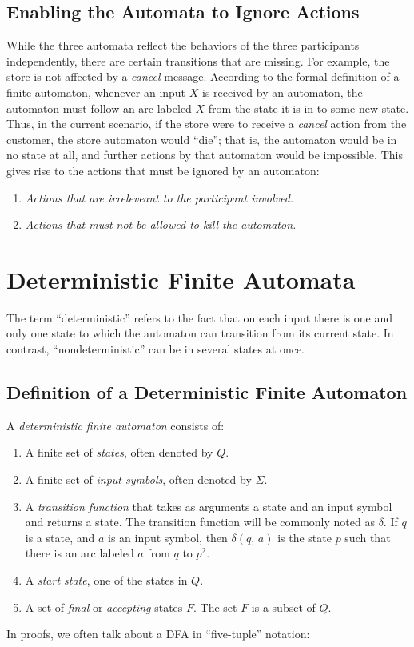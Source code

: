 \documentclass[]{article}
\begin{document}
  \subsection*{Enabling the Automata to Ignore Actions}
    While the three automata reflect the behaviors of the three participants
    independently, there are certain transitions that are missing. For
    example, the store is not affected by a \emph{cancel} message. According
    to the formal definition of a finite automaton, whenever an input $X$ is
    received by an automaton, the automaton must follow an arc labeled $X$
    from the state it is in to some new state. \\
    \indent Thus, in the current scenario, if the store were to receive a
    \emph{cancel} action from the customer, the store automaton would ``die'';
    that is, the automaton would be in no state at all, and further actions by 
    that automaton would be impossible. This gives rise to the actions that
    must be ignored by an automaton:
    \begin{enumerate}
      \item \emph{Actions that are irreleveant to the participant involved.}
      \item \emph{Actions that must not be allowed to kill the automaton.}
    \end{enumerate}

\section*{Deterministic Finite Automata}
  The term ``deterministic'' refers to the fact that on each input there is
  one and only one state to which the automaton can transition from its
  current state. In contrast, ``nondeterministic'' can be in several states at
  once.
  
  \subsection*{Definition of a Deterministic Finite Automaton}
    A \emph{deterministic finite automaton} consists of:
    \begin{enumerate}
      \item A finite set of \emph{states}, often denoted by $Q$.
      \item A finite set of \emph{input symbols}, often denoted by $\Sigma$.
      \item A \emph{transition function} that takes as arguments a state and
      an input symbol and returns a state. The transition function will be
      commonly noted as $\delta$. If $q$ is a state, and $a$ is an input
      symbol, then $\delta(q, \, a)$ is the state $p$ such that there is an
      arc labeled $a$ from $q$ to $p^2$.
      \item A \emph{start state}, one of the states in $Q$.
      \item A set of \emph{final} or \emph{accepting} states $F$. The set $F$
      is a subset of $Q$.
    \end{enumerate}
    In proofs, we often talk about a DFA in ``five-tuple'' notation:
    
\end{document}
